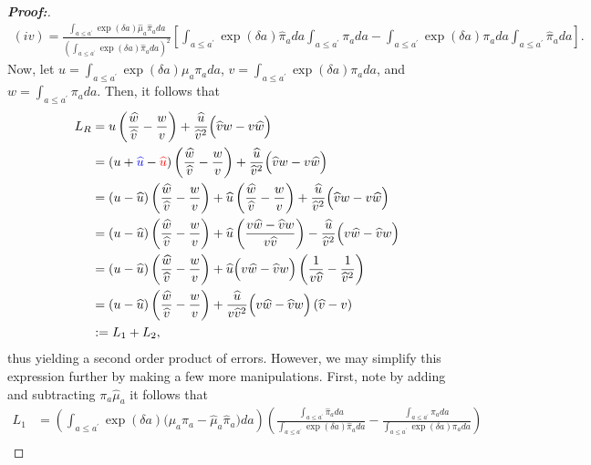 \documentclass[11pt,twoside]{article}
\theoremstyle{definition}
\theoremstyle{remark}
\begin{document}
\begin{proof}[\textbf{Proof:}]
\begin{align*}
     (iv) = \frac{\int_{a \leq a^{\prime}} \exp(\delta a) \widehat{\mu}_a \widehat{\pi}_a da}{\left(\int_{a \leq a^{\prime}} \exp(\delta a) \widehat{\pi}_a da \right)^2}\left[ \int_{a \leq a^{\prime}} \exp(\delta a) \widehat{\pi}_a da \int_{a \leq a^{\prime}} \pi_a da  -  \int_{a \leq a^{\prime}} \exp(\delta a) \pi_a da \int_{a \leq a^{\prime}} \widehat{\pi}_a da  \right].
\end{align*}
Now, let $u = \int_{a \leq a^{\prime}} \exp(\delta a) \mu_a \pi_a da$, $v = \int_{a \leq a^{\prime}} \exp(\delta a) \pi_a da$, and $w = \int_{a \leq a^{\prime}} \pi_a da$. Then, it follows that
\begin{align*}
    L_R &= u \left(\frac{\widehat{w}}{\widehat{v}} - \frac{w}{v} \right) + \frac{\widehat{u}}{\widehat{v}^2}\Big( \widehat{v} w - v \widehat{w} \Big) \\
    &= (u + \textcolor{blue}{\widehat{u}} - \textcolor{red}{\widehat{u}}) \left(\frac{\widehat{w}}{\widehat{v}} - \frac{w}{v} \right) + \frac{\widehat{u}}{\widehat{v}^2}\Big( \widehat{v} w - v \widehat{w} \Big) \\
    &= (u - \widehat{u}) \left(\frac{\widehat{w}}{\widehat{v}} - \frac{w}{v} \right) + \widehat{u} \left(\frac{\widehat{w}}{\widehat{v}} - \frac{w}{v} \right) + \frac{\widehat{u}}{\widehat{v}^2}\Big( \widehat{v} w - v \widehat{w} \Big) \\
    &= (u - \widehat{u}) \left(\frac{\widehat{w}}{\widehat{v}} - \frac{w}{v} \right) + \widehat{u} \left(\frac{v\widehat{w} - \widehat{v} w}{v\widehat{v}} \right) - \frac{\widehat{u}}{\widehat{v}^2}\Big(v\widehat{w} -\widehat{v} w \Big) \\
    &=  (u - \widehat{u}) \left(\frac{\widehat{w}}{\widehat{v}} - \frac{w}{v} \right) + \widehat{u} \Big( v\widehat{w} -\widehat{v} w \Big)
 \left(\frac{1}{v\widehat{v}} - \frac{1}{\widehat{v}^2} \right) \\
 &=  (u - \widehat{u}) \left(\frac{\widehat{w}}{\widehat{v}} - \frac{w}{v} \right) + \frac{\widehat{u}}{v \widehat{v}^2} \Big( v\widehat{w} -\widehat{v} w \Big)
 \left(\widehat{v} - v \right) \\
 &:= L_1 + L_2,
\end{align*}
thus yielding a second order product of errors. However, we may simplify this expression further by making a few more manipulations. First, note by adding and subtracting $\pi_a \widehat{\mu}_a$ it follows that
\begin{align*}
    L_1 &= \left(\int_{a \leq a^{\prime}} \exp(\delta a) \Big(\mu_a \pi_a  - \widehat{\mu}_a \widehat{\pi}_a \Big) da \right) \left( \frac{\int_{a \leq a^{\prime}} \widehat{\pi}_a da}{\int_{a \leq a^{\prime}} \exp(\delta a) \widehat{\pi}_a da} - \frac{\int_{a \leq a^{\prime}} \pi_a da}{\int_{a \leq a^{\prime}} \exp(\delta a) \pi_a da}  \right) \\

\end{align*}
\end{proof}
\end{document}
